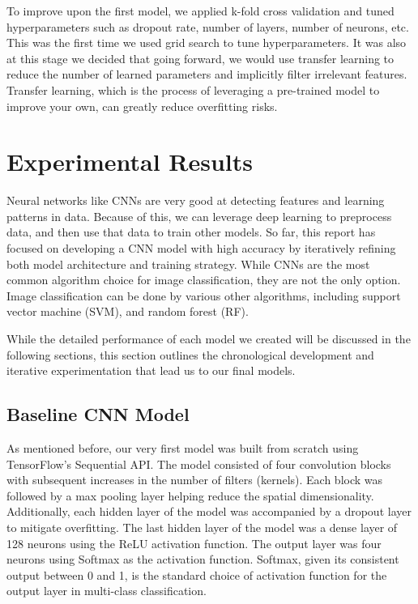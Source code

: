 \documentclass[conference]{IEEEtran}
\begin{document}
To improve upon the first model, we applied k-fold cross validation and tuned hyperparameters such as dropout rate, number of layers, number of neurons, etc. This was the first time we used grid search to tune hyperparameters. It was also at this stage we decided that going forward, we would use transfer learning to reduce the number of learned parameters and implicitly filter irrelevant features. Transfer learning, which is the process of leveraging a pre-trained model to improve your own, can greatly reduce overfitting risks. 

\section{\large Experimental Results}

Neural networks like CNNs are very good at detecting features and learning patterns in data. Because of this, we can leverage deep learning to preprocess data, and then use that data to train other models. So far, this report has focused on developing a CNN model with high accuracy by iteratively refining both model architecture and training strategy. While CNNs are the most common algorithm choice for image classification, they are not the only option. Image classification can be done by various other algorithms, including support vector machine (SVM), and random forest (RF). 

While the detailed performance of each model we created will be discussed in the following sections, this section outlines the chronological development and iterative experimentation that lead us to our final models.

\subsection{\large Baseline CNN Model}

As mentioned before, our very first model was built from scratch using TensorFlow's Sequential API. The model consisted of four convolution blocks with subsequent increases in the number of filters (kernels). Each block was followed by a max pooling layer helping reduce the spatial dimensionality. Additionally, each hidden layer of the model was accompanied by a dropout layer to mitigate overfitting. The last hidden layer of the model was a dense layer of 128 neurons using the ReLU activation function. The output layer was four neurons using Softmax as the activation function. Softmax, given its consistent output between 0 and 1, is the standard choice of activation function for the output layer in multi-class classification. 
\end{document}

